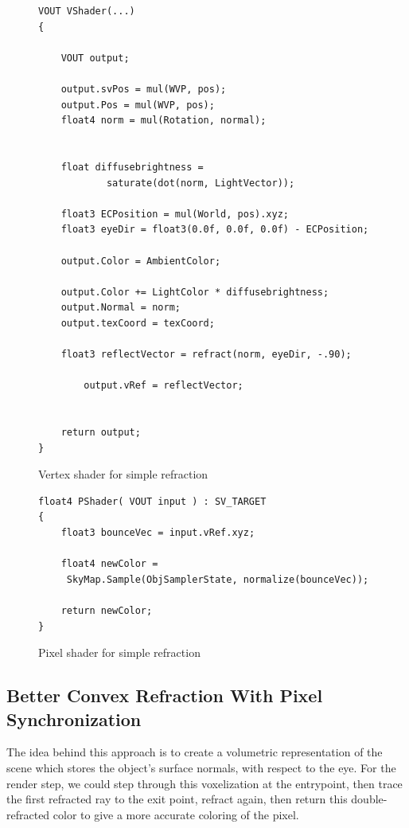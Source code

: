 \documentclass[a4paper, 12pt]{article}
\begin{document}
\begin{figure}[h]
\begin{lstlisting}[breaklines=true,language=HLSL]
VOUT VShader(...)
{

	VOUT output;

	output.svPos = mul(WVP, pos);
	output.Pos = mul(WVP, pos);
	float4 norm = mul(Rotation, normal);


	float diffusebrightness = 
			saturate(dot(norm, LightVector));

	float3 ECPosition = mul(World, pos).xyz;
	float3 eyeDir = float3(0.0f, 0.0f, 0.0f) - ECPosition;
	
	output.Color = AmbientColor;

	output.Color += LightColor * diffusebrightness;
	output.Normal = norm;
	output.texCoord = texCoord;

	float3 reflectVector = refract(norm, eyeDir, -.90);

		output.vRef = reflectVector;


	return output;
}
\end{lstlisting}

\caption{Vertex shader for simple refraction}
\label{code:VSSimpleRefract}
\end{figure}

\begin{figure}[h]
\begin{lstlisting}[breaklines=true,language=HLSL]
float4 PShader( VOUT input ) : SV_TARGET
{	
	float3 bounceVec = input.vRef.xyz;
	
	float4 newColor = 
	 SkyMap.Sample(ObjSamplerState, normalize(bounceVec));
	
	return newColor;
}
\end{lstlisting}

\caption{Pixel shader for simple refraction}
\label{code:PSSimpleRefract}
\end{figure}

\subsection{Better Convex Refraction With Pixel Synchronization}

The idea behind this approach is to create a volumetric representation of the
scene which stores the object's surface normals, with respect to the eye. For
the render step, we could step through this voxelization at the entrypoint,
then trace the first refracted ray to the exit point, refract again, then
return this double-refracted color to give a more accurate coloring of the
pixel.
\end{document}
